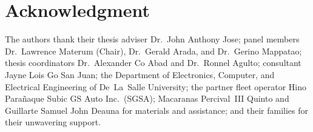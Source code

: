 \documentclass[10pt,journal]{IEEEtran}
\begin{document}
\section*{Acknowledgment}
The authors thank their thesis adviser Dr.~John Anthony Jose; panel members Dr.~Lawrence Materum (Chair), Dr.~Gerald Arada, and Dr.~Gerino Mappatao; thesis coordinators Dr.~Alexander Co Abad and Dr.~Ronnel Agulto; consultant Jayne Lois Go San Juan; the Department of Electronics, Computer, and Electrical Engineering of De~La~Salle University; the partner fleet operator Hino Para\~naque Subic GS Auto Inc.~(SGSA); Macaranas Percival~III Quinto and Guillarte Samuel John Deauna for materials and assistance; and their families for their unwavering support.
\ifCLASSOPTIONcaptionsoff
  \newpage
\fi



\end{document}
